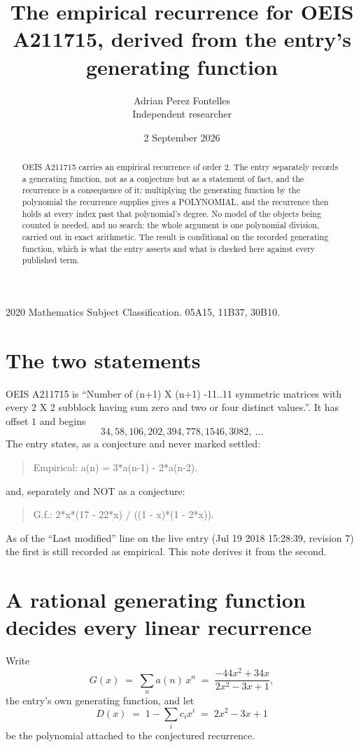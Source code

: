 \documentclass[11pt,a4paper]{article}
\title{The empirical recurrence for OEIS A211715, derived from the entry's generating function}
\author{Adrian Perez Fontelles\\ \small Independent researcher}
\date{2 September 2026}
\theoremstyle{plain}
\theoremstyle{definition}
\begin{document}
\maketitle

\begin{abstract}
OEIS A211715 carries an empirical recurrence of order $2$. The entry separately records a
generating function, not as a conjecture but as a statement of fact, and the recurrence is a
consequence of it: multiplying the generating function by the polynomial the recurrence
supplies gives a POLYNOMIAL, and the recurrence then holds at every index past that
polynomial's degree. No model of the objects being counted is needed, and no search: the
whole argument is one polynomial division, carried out in exact arithmetic. The result is
conditional on the recorded generating function, which is what the entry asserts and what is
checked here against every published term.
\end{abstract}

\noindent\small 2020 Mathematics Subject Classification. 05A15, 11B37, 30B10.\normalsize

\section{The two statements}

OEIS A211715 is ``Number of (n+1) X (n+1) -11..11 symmetric matrices with every 2 X 2 subblock having sum zero and two or four distinct values.''. It has offset $1$ and begins
\[
34, 58, 106, 202, 394, 778, 1546, 3082,\ \dots
\]
The entry states, as a conjecture and never marked settled:
\begin{quote}
Empirical: a(n) = 3*a(n-1) - 2*a(n-2).
\end{quote}
and, separately and NOT as a conjecture:
\begin{quote}
G.f.: 2*x*(17 - 22*x) / ((1 - x)*(1 - 2*x)).
\end{quote}
As of the ``Last modified'' line on the live entry (Jul 19 2018 15:28:39, revision 7) the first is still
recorded as empirical. This note derives it from the second.

\section{A rational generating function decides every linear recurrence}

Write
\[
G(x)\;=\;\sum_{n}a(n)\,x^{n}\;=\;\frac{- 44 x^{2} + 34 x}{2 x^{2} - 3 x + 1},
\]
the entry's own generating function, and let
\[
D(x)\;=\;1-\sum_i c_i x^{i}\;=\;2 x^{2} - 3 x + 1
\]
be the polynomial attached to the conjectured recurrence.
\end{document}
